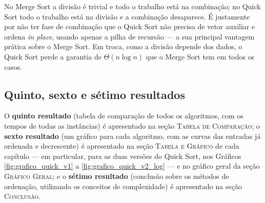 \qquad No Merge Sort a divisão é trivial e todo o trabalho está na
combinação; no Quick Sort todo o trabalho está na divisão e a
combinação desaparece. É justamente por não ter fase de combinação
que o Quick Sort não precisa de vetor auxiliar e ordena \textit{in
place}, usando apenas a pilha de recursão --- a sua principal vantagem
prática sobre o Merge Sort. Em troca, como a divisão depende dos
dados, o Quick Sort perde a garantia de $\Theta(n \log n)$ que o Merge
Sort tem em todos os casos.

\subsection{Quinto, sexto e sétimo resultados}

\qquad O \textbf{quinto resultado} (tabela de comparação de todos os
algoritmos, com os tempos de todas as instâncias) é apresentado na
seção \textsc{Tabela de Comparação}; o \textbf{sexto resultado}
(um gráfico para cada algoritmo, com as curvas das entradas já
ordenada e decrescente) é apresentado na seção \textsc{Tabela e
Gráfico} de cada capítulo --- em particular, para as duas versões do
Quick Sort, nos Gráficos \ref{fig:grafico_quick_v1} a
\ref{fig:grafico_quick_v2_log} --- e no gráfico geral da seção
\textsc{Gráfico Geral}; e o \textbf{sétimo resultado} (conclusão sobre
os métodos de ordenação, utilizando os conceitos de complexidade) é
apresentado na seção \textsc{Conclusão}.
